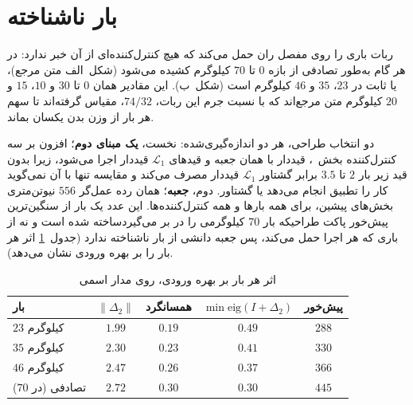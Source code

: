 \documentclass[10pt,twocolumn]{article}
\newcommand{\en}[1]{\lr{#1}}
\newcommand{\md}{\lr{\textemdash}}
\begin{document}
\section{بار ناشناخته}
ربات باری را روی مفصل ران حمل می‌کند که هیچ کنترل‌کننده‌ای از آن خبر ندارد: در هر
گام به‌طور تصادفی از بازه $0$ تا $70$ کیلوگرم کشیده می‌شود (شکل~\en{4.11}الف متن مرجع)،
یا ثابت در $23$، $35$ و $46$ کیلوگرم است (شکل~\en{4.11}ب). این مقادیر همان $0$ تا $30$ و
$10$، $15$ و $20$ کیلوگرم متن مرجع‌اند که با نسبت جرم این ربات، $74/32$، مقیاس
گرفته‌اند تا سهم هر بار از وزن بدن یکسان بماند.

دو انتخاب طراحی، هر دو اندازه‌گیری‌شده: نخست، \textbf{یک مبنای دوم}؛ افزون بر سه
کنترل‌کننده بخش~\en{4.2.4}، \en{CLF-QP} قیددار با همان جعبه و قیدهای $\mathcal{L}_1$ قیددار اجرا
می‌شود، زیرا \en{CLF-QP} بدون قید زیر بار $2$ تا $3.5$ برابر گشتاور $\mathcal{L}_1$ قیددار
مصرف می‌کند و مقایسه تنها با آن نمی‌گوید کار را تطبیق انجام می‌دهد یا گشتاور.
دوم، \textbf{جعبه}؛ همان رده عمل‌گر $556$ نیوتن‌متری بخش‌های پیشین، برای همه بارها
و همه کنترل‌کننده‌ها. این عدد یک بار از سنگین‌ترین پیش‌خور پاکت طراحی\md{}که بار
$70$ کیلوگرمی را در بر می‌گیرد\md{}ساخته شده است و نه از باری که هر اجرا حمل می‌کند،
پس جعبه دانشی از بار ناشناخته ندارد
(جدول~\ref{tab:loads} اثر هر بار را بر بهره ورودی نشان می‌دهد).

\begin{table}[H]
    \centering
    \caption{اثر هر بار بر بهره ورودی، روی مدار اسمی}
    \label{tab:loads}
    \small
    \begin{tabular}{lcccc}
        \toprule
        بار & $\|\Delta_2\|$ & همسانگرد & $\min\mathrm{eig}(I+\Delta_2)$ & پیش‌خور \\
        \midrule
        $23$ کیلوگرم & $1.99$ & $0.19$ & $0.49$ & $288$ \\
        $35$ کیلوگرم & $2.30$ & $0.23$ & $0.41$ & $330$ \\
        $46$ کیلوگرم & $2.47$ & $0.26$ & $0.37$ & $366$ \\
        تصادفی (در $70$) & $2.72$ & $0.30$ & $0.30$ & $445$ \\
        \bottomrule
    \end{tabular}
\end{table}
\end{document}

